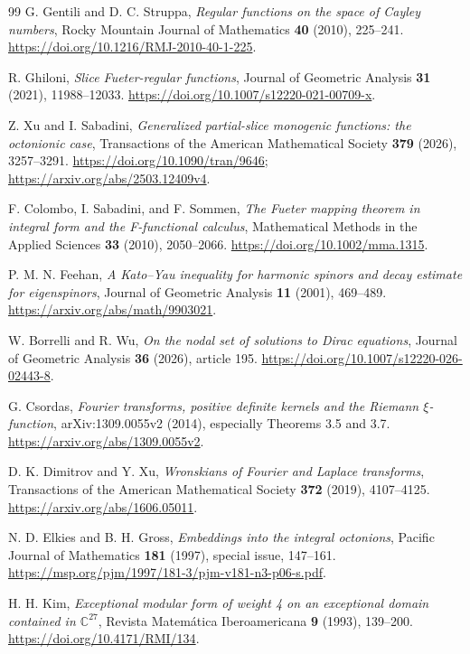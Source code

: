\documentclass[11pt]{article}
\numberwithin{equation}{section}
\theoremstyle{definition}
\theoremstyle{remark}
\begin{document}
\begin{thebibliography}{99}
G. Gentili and D. C. Struppa,
\emph{Regular functions on the space of Cayley numbers},
Rocky Mountain Journal of Mathematics \textbf{40} (2010), 225--241.
\url{https://doi.org/10.1216/RMJ-2010-40-1-225}.

R. Ghiloni, \emph{Slice Fueter-regular functions},
Journal of Geometric Analysis \textbf{31} (2021), 11988--12033.
\url{https://doi.org/10.1007/s12220-021-00709-x}.

Z. Xu and I. Sabadini,
\emph{Generalized partial-slice monogenic functions: the octonionic case},
Transactions of the American Mathematical Society \textbf{379} (2026),
3257--3291. \url{https://doi.org/10.1090/tran/9646};
\url{https://arxiv.org/abs/2503.12409v4}.

F. Colombo, I. Sabadini, and F. Sommen,
\emph{The Fueter mapping theorem in integral form and the F-functional
calculus}, Mathematical Methods in the Applied Sciences \textbf{33}
(2010), 2050--2066. \url{https://doi.org/10.1002/mma.1315}.

P. M. N. Feehan, \emph{A Kato--Yau inequality for harmonic spinors and
decay estimate for eigenspinors}, Journal of Geometric Analysis
\textbf{11} (2001), 469--489.
\url{https://arxiv.org/abs/math/9903021}.

W. Borrelli and R. Wu, \emph{On the nodal set of solutions to Dirac
equations}, Journal of Geometric Analysis \textbf{36} (2026), article 195.
\url{https://doi.org/10.1007/s12220-026-02443-8}.

G. Csordas, \emph{Fourier transforms, positive definite kernels and the
Riemann $\xi$-function}, arXiv:1309.0055v2 (2014),
especially Theorems 3.5 and 3.7.
\url{https://arxiv.org/abs/1309.0055v2}.

D. K. Dimitrov and Y. Xu, \emph{Wronskians of Fourier and Laplace
transforms}, Transactions of the American Mathematical Society
\textbf{372} (2019), 4107--4125.
\url{https://arxiv.org/abs/1606.05011}.

N. D. Elkies and B. H. Gross, \emph{Embeddings into the integral
octonions}, Pacific Journal of Mathematics \textbf{181} (1997),
special issue, 147--161.
\url{https://msp.org/pjm/1997/181-3/pjm-v181-n3-p06-s.pdf}.

H. H. Kim, \emph{Exceptional modular form of weight 4 on an exceptional
domain contained in $\mathbb C^{27}$}, Revista Matem\'atica Iberoamericana
\textbf{9} (1993), 139--200. \url{https://doi.org/10.4171/RMI/134}.


\end{thebibliography}
\end{document}
